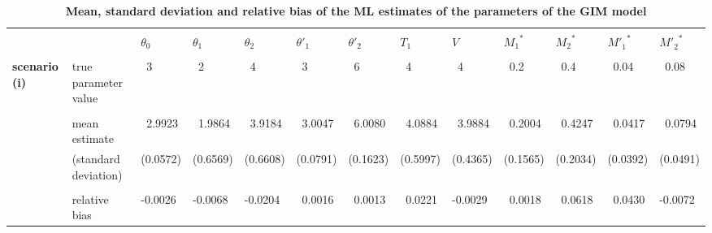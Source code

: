 \documentclass[11pt]{article}
\begin{document}
\begin{sidewaystable}[!p]
\vspace*{0.5cm}
\caption{\bf \\Mean, standard deviation and relative bias of the ML estimates of the parameters of the GIM model} 
\label{simresults}
\vspace*{-3mm}
\begin{center}
{\small \begin{tabular}{|l|l|lllllllllll|} \hline  
\vspace*{-2mm} & & & & & & & & & & & & \\
  & & $\theta_0$ & $\theta_1$ & $\theta_2$ & $\theta'_1$ & $\theta'_2$ & $T_1$ & $V$ & ${M_1}^{\!*}$ & ${M_2}^{\!*}$ & ${M'_1}^{*}$ & ${M'_2}^{*}$ \\ \hline 
\vspace*{-2mm} & & & & & & & & & & & & \\
 {\bf scenario (i)} & true parameter value & ~3 & ~2 & ~4 & ~3 & ~6 & ~4 & ~4 & ~0.2 & ~0.4 & ~0.04 & ~0.08 
\\ \vspace*{-2mm} & & & & & & & & & & & & \\
& mean estimate & ~2.9923 & ~1.9864 & ~3.9184 & ~3.0047 & ~6.0080 & ~4.0884 & ~3.9884  & ~0.2004 & ~0.4247 & ~0.0417 & ~0.0794 \\
& (standard deviation) & (0.0572) & (0.6569)& (0.6608) & (0.0791) & (0.1623) & (0.5997) & (0.4365) & (0.1565) & (0.2034) & (0.0392) & (0.0491) 
\\ \vspace*{-2mm} & & & & & & & & & & & & \\
& relative bias & -0.0026 & -0.0068 & -0.0204 & ~0.0016 & ~0.0013 & ~0.0221 & -0.0029 & ~0.0018 & ~0.0618 & ~0.0430 & -0.0072 

\end{tabular}}
\end{center}
\end{sidewaystable}
\end{document}
